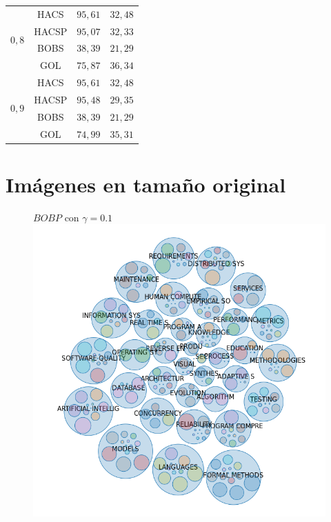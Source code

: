 \begin{table}[H]
{\begin{tabular}{|c|c|c|c|}
    \multirow{ 4}{*}{$0,8$} & HACS & $95,61$ & $32,48$ \\
 & HACSP & $95,07$ & $32,33$ \\
 & BOBS & $38,39$ & $21,29$ \\
 & GOL & $75,87$ & $36,34$ \\ \hline
    \multirow{ 4}{*}{$0,9$} & HACS & $95,61$ & $32,48$ \\
 & HACSP & $95,48$ & $29,35$ \\
 & BOBS & $38,39$ & $21,29$ \\
 & GOL & $74,99$ & $35,31$ \\
    \hline
    \end{tabular}
    \label{tabla:intrainter}
  }
\end{table}

\section{Imágenes en tamaño original}\label{apendice:imagenes}

\begin{figure}[H]
	\centering
	$BOBP$ con $\gamma=0.1$ \\
	\includegraphics[width=0.80\linewidth, height=\textheight,keepaspectratio]{img/gamma-01-burbujas-alg-3.png}
	\caption{}
	\label{res:gamma01-bur-alg-3}
\end{figure}

